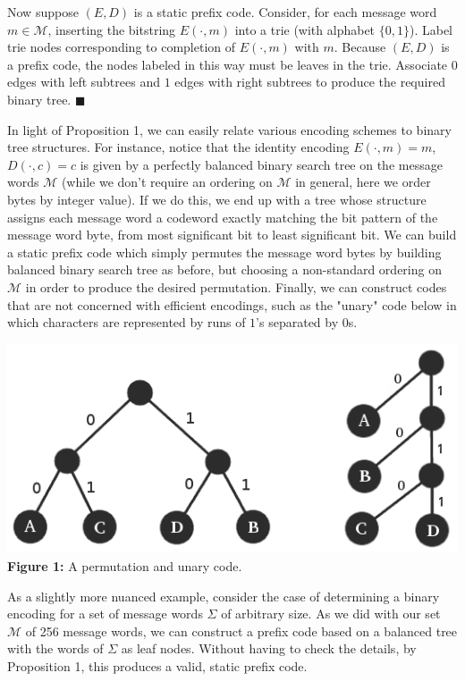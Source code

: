 \documentclass[twoside]{article}
\begin{document}
\begin{multicols}{2}
Now suppose $(E, D)$ is a static prefix code. Consider, for each message word $m \in \mathcal{M}$, inserting the bitstring $E(\cdot, m)$ into a trie (with alphabet $\{0, 1\}$). Label trie nodes corresponding to completion of $E(\cdot, m)$ with $m$. Because $(E, D)$ is a prefix code, the nodes labeled in this way must be leaves in the trie. Associate $0$ edges with left subtrees and $1$ edges with right subtrees to produce the required binary tree. \nolinebreak $\blacksquare$

\vspace{0.5em}
In light of Proposition 1, we can easily relate various encoding schemes to binary tree structures. For instance, notice that the identity encoding $E(\cdot, m) = m$, $D(\cdot, c) = c$ is given by a perfectly balanced binary search tree on the message words $\mathcal{M}$ (while we don't require an ordering on $\mathcal{M}$ in general, here we order bytes by integer value). If we do this, we end up with a tree whose structure assigns each message word a codeword exactly matching the bit pattern of the message word byte, from most significant bit to least significant bit. We can build a static prefix code which simply permutes the message word bytes by building balanced binary search tree as before, but choosing a non-standard ordering on $\mathcal{M}$ in order to produce the desired permutation. Finally, we can construct codes that are not concerned with efficient encodings, such as the "unary" code below in which characters are represented by runs of $1$'s separated by $0$s.

\begin{center}
\includegraphics[scale=0.35]{staticid_unary}
\textbf{Figure 1:} A permutation and unary code.
\end{center}

As a slightly more nuanced example, consider the case of determining a binary encoding for a set of message words $\Sigma$ of arbitrary size. As we did with our set $\mathcal{M}$ of 256 message words, we can construct a prefix code based on a balanced tree with the words of $\Sigma$ as leaf nodes. Without having to check the details, by Proposition 1, this produces a valid, static prefix code.


\end{multicols}
\end{document}
